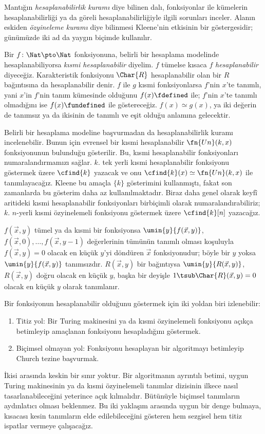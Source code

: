 \documentclass[../../../include/open-logic-section]{subfiles}
\begin{document}

Mantığın \emph{hesaplanabilirlik kuramı} diye bilinen dalı, fonksiyonlar ile
kümelerin hesaplanabilirliği ya da göreli hesaplanabilirliğiyle ilgili
sorunları inceler. Alanın eskiden \emph{özyineleme kuramı} diye bilinmesi
Kleene'nin etkisinin bir göstergesidir; günümüzde iki ad da yaygın biçimde
kullanılır.

Bir $f\colon\Nat\pto\Nat$ fonksiyonuna, belirli bir hesaplama modelinde
hesaplanabiliyorsa \emph{kısmi hesaplanabilir} diyelim. $f$ tümelse kısaca
$f$ \emph{hesaplanabilir} diyeceğiz. Karakteristik fonksiyonu $\Char{R}$
hesaplanabilir olan bir $R$ bağıntısına da hesaplanabilir denir. $f$ ile $g$
kısmi fonksiyonlarsa $f$'nin $x$'te tanımlı, yani $x$'in $f$'nin tanım
kümesinde olduğunu $f(x)\fdefined$ ile; $f$'nin $x$'te tanımlı olmadığını ise
$f(x)\fundefined$ ile göstereceğiz. $f(x)\simeq g(x)$, ya iki değerin de
tanımsız ya da ikisinin de tanımlı ve eşit olduğu anlamına gelecektir.

Belirli bir hesaplama modeline başvurmadan da hesaplanabilirlik kuramı
incelenebilir. Bunun için evrensel bir kısmi hesaplanabilir
$\fn{Un}(k,x)$ fonksiyonunun bulunduğu gösterilir. Bu, kısmi hesaplanabilir
fonksiyonları numaralandırmamızı sağlar. $k$. tek yerli kısmi hesaplanabilir
fonksiyonu göstermek üzere $\cfind{k}$ yazacak ve onu
$\cfind{k}(x)\simeq\fn{Un}(k,x)$ ile tanımlayacağız. Kleene bu amaçla
$\{k\}$ gösterimini kullanmıştı, fakat son zamanlarda bu gösterim daha az
kullanılmaktadır. Biraz daha genel olarak keyfî aritideki kısmi hesaplanabilir
fonksiyonları birbiçimli olarak numaralandırabiliriz; $k$. $n$-yerli kısmi
özyinelemeli fonksiyonu göstermek üzere $\cfind{k}[n]$ yazacağız.

$f(\vec x,y)$ tümel ya da kısmi bir fonksiyonsa
$\umin{y}{f(\vec x,y)}$, $f(\vec x,0),\dots,f(\vec x,y-1)$ değerlerinin
tümünün tanımlı olması koşuluyla $f(\vec x,y)=0$ olacak en küçük $y$'yi
döndüren $\vec x$ fonksiyonudur; böyle bir $y$ yoksa
$\umin{y}{f(\vec x,y)}$ tanımsızdır. $R(\vec x,y)$ bir bağıntıysa
$\umin{y}{R(\vec x,y)}$, $R(\vec x,y)$ doğru olacak en küçük $y$, başka bir
deyişle $1\tsub\Char{R}(\vec x,y)=0$ olacak en küçük $y$ olarak tanımlanır.

Bir fonksiyonun hesaplanabilir olduğunu göstermek için iki yoldan biri
izlenebilir:
\begin{enumerate}
\item Titiz yol: Bir Turing makinesini ya da kısmi özyinelemeli fonksiyonu
  açıkça betimleyip amaçlanan fonksiyonu hesapladığını göstermek.
\item Biçimsel olmayan yol: Fonksiyonu hesaplayan bir algoritmayı betimleyip
  Church tezine başvurmak.
\end{enumerate}
İkisi arasında keskin bir sınır yoktur. Bir algoritmanın ayrıntılı betimi,
uygun Turing makinesinin ya da kısmi özyinelemeli tanımlar dizisinin ilkece
nasıl tasarlanabileceğini yeterince açık kılmalıdır. Bütünüyle biçimsel
tanımların aydınlatıcı olması beklenmez. Bu iki yaklaşım arasında uygun bir
denge bulmaya, kısacası kesin tanımların elde edilebileceğini gösteren hem
sezgisel hem titiz ispatlar vermeye çalışacağız.
\end{document}
